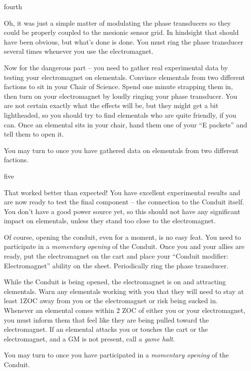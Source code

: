 \documentclass[notebook]{elementals}
\begin{document}
\begin{page}{fourth}

Oh, it was just a simple matter of modulating the phase transducers so they could be properly coupled to the mesionic sensor grid. In hindsight that should have been obvious, but what's done is done. You must ring the phase transducer several times whenever you use the electromagnet.

Now for the dangerous part -- you need to gather real experimental data by testing your electromagnet on elementals. Convince elementals from two different factions to sit in your Chair of Science. Spend one minute strapping them in, then turn on your electromagnet by loudly ringing your phase transducer. You are not certain exactly what the effects will be, but they might get a bit lightheaded, so you should try to find elementals who are quite friendly, if you can. Once an elemental sits in your chair, hand them one of your ``E packets'' and tell them to open it.

You may turn to  once you have gathered data on elementals from two different factions.

\end{page}

\begin{page}{five}

That worked better than expected! You have excellent experimental results and are now ready to test the final component -- the connection to the Conduit itself. You don't have a good power source yet, so this should not have any significant impact on elementals, unless they stand too close to the electromagnet.

Of course, opening the conduit, even for a moment, is no easy feat. You need to participate in a \emph{momentary opening} of the Conduit. Once you and your allies are ready, put the electromagnet on the cart and place your ``Conduit modifier: Electromagnet'' ability on the sheet. Periodically ring the phase transducer.

While the Conduit is being opened, the electromagnet is on and attracting elementals. Warn any elementals working with you that they will need to stay at least 1ZOC away from you or the electromagnet or risk being sucked in. Whenever an elemental comes within 2 ZOC of either you or your electromagnet, you must inform them that feel like they are being pulled toward the electromagnet. If an elemental attacks you or touches the cart or the electromagnet, and a GM is not present, call a \emph{game halt}.

You may turn to  once you have participated in a \emph{momentary opening} of the Conduit.

\end{page}
\end{document}
